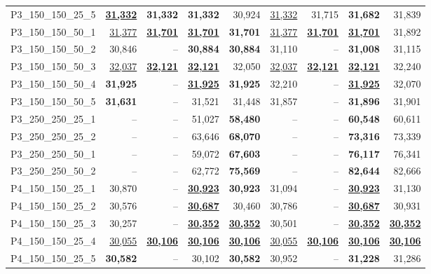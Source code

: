 \documentclass[smallextended]{svjour3}       %
\begin{document}
\begin{table}
\begin{tabular}{lrrrrrrrr}
P3\_150\_150\_25\_5 & \underline{\textbf{31,332}} & \textbf{31,332} & \textbf{31,332} & 30,924 & \underline{31,332} & 31,715 & \textbf{31,682} & 31,839 \\
P3\_150\_150\_50\_1 & \underline{31,377} & \underline{\textbf{31,701}} & \underline{\textbf{31,701}} & \textbf{31,701} & \underline{31,377} & \underline{\textbf{31,701}} & \underline{\textbf{31,701}} & 31,892 \\
P3\_150\_150\_50\_2 & 30,846 & -- & \textbf{30,884} & \textbf{30,884} & 31,110 & -- & \textbf{31,008} & 31,115 \\
P3\_150\_150\_50\_3 & \underline{32,037} & \underline{\textbf{32,121}} & \underline{\textbf{32,121}} & 32,050 & \underline{32,037} & \underline{\textbf{32,121}} & \underline{\textbf{32,121}} & 32,240 \\
P3\_150\_150\_50\_4 & \textbf{31,925} & -- & \underline{\textbf{31,925}} & \textbf{31,925} & 32,210 & -- & \underline{\textbf{31,925}} & 32,070 \\
P3\_150\_150\_50\_5 & \textbf{31,631} & -- & 31,521 & 31,448 & 31,857 & -- & \textbf{31,896} & 31,901 \\
P3\_250\_250\_25\_1 & -- & -- & 51,027 & \textbf{58,480} & -- & -- & \textbf{60,548} & 60,611 \\
P3\_250\_250\_25\_2 & -- & -- & 63,646 & \textbf{68,070} & -- & -- & \textbf{73,316} & 73,339 \\
P3\_250\_250\_50\_1 & -- & -- & 59,072 & \textbf{67,603} & -- & -- & \textbf{76,117} & 76,341 \\
P3\_250\_250\_50\_2 & -- & -- & 62,772 & \textbf{75,569} & -- & -- & \textbf{82,644} & 82,666 \\
P4\_150\_150\_25\_1 & 30,870 & -- & \underline{\textbf{30,923}} & \textbf{30,923} & 31,094 & -- & \underline{\textbf{30,923}} & 31,130 \\
P4\_150\_150\_25\_2 & 30,576 & -- & \underline{\textbf{30,687}} & 30,460 & 30,786 & -- & \underline{\textbf{30,687}} & 30,931 \\
P4\_150\_150\_25\_3 & 30,257 & -- & \underline{\textbf{30,352}} & \underline{\textbf{30,352}} & 30,501 & -- & \underline{\textbf{30,352}} & \underline{\textbf{30,352}} \\
P4\_150\_150\_25\_4 & \underline{30,055} & \underline{\textbf{30,106}} & \underline{\textbf{30,106}} & \underline{\textbf{30,106}} & \underline{30,055} & \underline{\textbf{30,106}} & \underline{\textbf{30,106}} & \underline{\textbf{30,106}} \\
P4\_150\_150\_25\_5 & \textbf{30,582} & -- & 30,102 & \textbf{30,582} & 30,952 & -- & \textbf{31,228} & 31,286 \\

\end{tabular}
\end{table}
\end{document}
